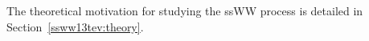 The theoretical motivation for studying the ssWW process is detailed in Section~\ref{ssww13tev:theory}.  
